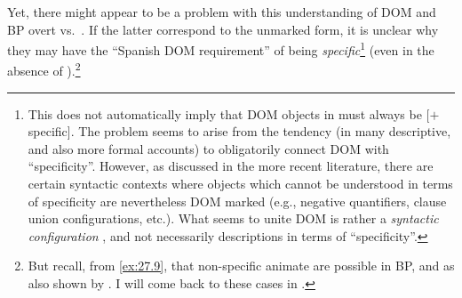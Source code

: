 \documentclass[output=paper]{langsci/langscibook}
\begin{document}
Yet, there might appear to be a problem with this understanding of DOM and
\gls{BP} overt vs.\ . If the latter
correspond to the unmarked form, it is unclear why they may have the ``Spanish
DOM requirement'' of being \emph{specific}\footnote{This does not automatically
    imply that DOM objects in  must always be [$+$specific]. The problem
    seems to arise from the tendency (in many descriptive, and also more formal
    accounts) to obligatorily connect DOM with
    \enquote{specificity}. However, as
    discussed in the more recent literature, there are certain syntactic
    contexts where objects which cannot be understood in terms of specificity
    are nevertheless DOM marked (e.g., negative quantifiers, clause union
configurations, etc.). What seems to unite DOM
is rather a \emph{syntactic configuration} \parencite{Lopez2012}, and not
necessarily descriptions in terms of \enquote{specificity}.}  (even in the
absence of ).\footnote{But recall, from \eqref{ex:27.9}, that
    non-specific animate  are possible in
    \gls{BP}, and as also shown by
    \textcite{Cyrino1994,Cyrino1997}. I will come back to these cases in
.}
\end{document}
